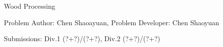 \begin{Solution}{Wood Processing}

\begin{frame}{\ProblemName}

\small Problem Author: Chen Shaoayuan, Problem Developer: Chen Shaoyuan \par \vspace{0.3cm}

\small Submissions: Div.1 (?+?)/(?+?), Div.2 (?+?)/(?+?)  \par \vspace{0.5cm}


\end{frame}

\end{Solution}

